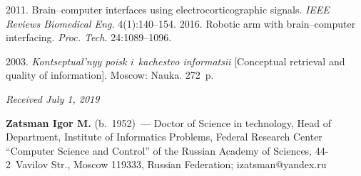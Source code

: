 \begin{multicols}{2}
{{\begin{thebibliography}{99}
 2011. Brain--computer interfaces using 
electrocorticographic signals. \textit{IEEE Reviews Biomedical Eng.} 
4(1):140--154.
 2016. Robotic arm with brain--computer interfacing. \textit{Proc. 
Tech.} 24:1089--1096.

 2003. \textit{Kontseptual'nyy poisk i~kachestvo informatsii} 
[Conceptual retrieval and quality of information]. Moscow: Nauka. 272~p.
    
\end{thebibliography}

 }
 }

\end{multicols}


\hfill{\small\textit{Received July 1, 2019}}




\Contrl

    
    \noindent
    \textbf{Zatsman Igor M.} (b.\ 1952)~--- Doctor of Science in 
technology, Head of Department, Institute of Informatics Problems, Federal 
Research Center ``Computer Science and Control'' of the Russian Academy 
of Sciences, 44-2~Vavilov Str., Moscow 119333, Russian Federation; 
\mbox{izatsman@yandex.ru}

\label{end\stat}

\renewcommand{\bibname}{\protect\rm Литература}
    
    